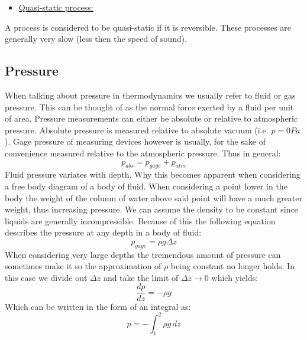 \documentclass[11pt, a4paper]{article}
\begin{document}
\begin{itemize}
  \item \underline{Quasi-static process:}
\end{itemize}
A process is considered to be quasi-static if it is reversible. These processes are generally very slow (less then the speed of sound).


\subsection{Pressure}
When talking about pressure in thermodynamics we usually refer to fluid or gas pressure. This can be thought of as the normal force exerted by a fluid per unit of area. Pressure measurements can either be absolute or relative to atmospheric pressure. Absolute pressure is measured relative to absolute vacuum (i.e. $p=0 Pa$). Gage pressure of measuring devices however is usually, for the sake of convenience measured relative to the atmospheric pressure. Thus in general:
\begin{equation}
  p_{abs} = p_{gage} + p_{atm}
\end{equation}
Fluid pressure variates with depth. Why this becomes apparent when considering a free body diagram of a body of fluid. When considering a point lower in the body the weight of the column of water above said point will have a much greater weight, thus increasing pressure. We can assume the density to be constant since liquids are generally incompressible. Because of this the following equation describes the pressure at any depth in a body of fluid:
\begin{equation}
  p_{gage} = \rho g \Delta z
\end{equation}
When considering very large depths the tremendous amount of pressure can sometimes make it so the approximation of $\rho$ being constant no longer holds. In this case we divide out $\Delta z$ and take the limit of $\Delta z \to 0$ which yields:
\begin{equation}
  \frac{dp}{dz} = -\rho g
\end{equation}
Which can be written in the form of an integral as:
\begin{equation}
  p = -\int_1^2 \rho g\,dz
\end{equation}
\end{document}
